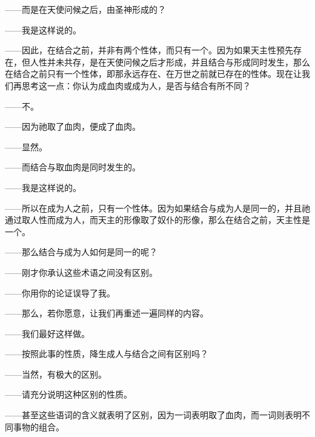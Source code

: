 ——而是在天使问候之后，由圣神形成的？\par

——我是这样说的。\par

——因此，在结合之前，并非有两个性体，而只有一个。因为如果天主性预先存在，但人性并未共存，是在天使问候之后才形成，并且结合与形成同时发生，那么在结合之前只有一个性体，即那永远存在、在万世之前就已存在的性体。现在让我们再思考这一点：你认为成血肉或成为人，是否与结合有所不同？\par

——不。\par

——因为祂取了血肉，便成了血肉。\par

——显然。\par

——而结合与取血肉是同时发生的。\par

——我是这样说的。\par

——所以在成为人之前，只有一个性体。因为如果结合与成为人是同一的，并且祂通过取人性而成为人，而天主的形像取了奴仆的形像，那么在结合之前，天主性是一个。\par

——那么结合与成为人如何是同一的呢？\par

——刚才你承认这些术语之间没有区别。\par

——你用你的论证误导了我。\par

——那么，若你愿意，让我们再重述一遍同样的内容。\par

——我们最好这样做。\par

——按照此事的性质，降生成人与结合之间有区别吗？\par

——当然，有极大的区别。\par

——请充分说明这种区别的性质。\par

——甚至这些语词的含义就表明了区别，因为一词表明取了血肉，而一词则表明不同事物的组合。\par

